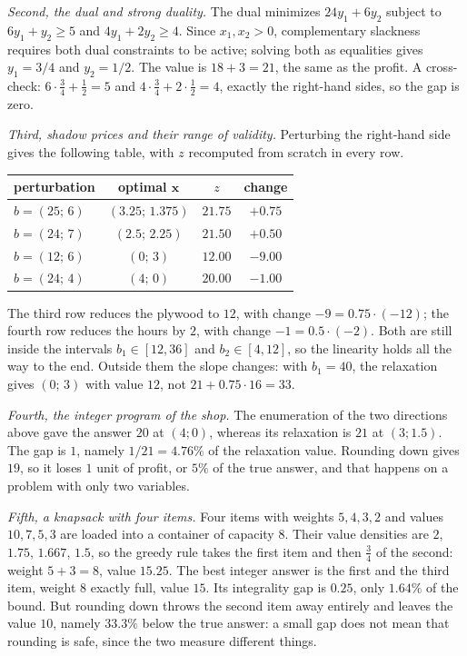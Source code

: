 \emph{Second, the dual and strong duality.} The dual minimizes $24y_{1}+6y_{2}$ subject to
$6y_{1}+y_{2}\ge5$ and $4y_{1}+2y_{2}\ge4$. Since $x_{1},x_{2}>0$, complementary slackness
requires both dual constraints to be active; solving both as equalities gives $y_{1}=3/4$ and
$y_{2}=1/2$. The value is $18+3=21$, the same as the profit. A cross-check:
$6\cdot\tfrac34+\tfrac12=5$ and $4\cdot\tfrac34+2\cdot\tfrac12=4$, exactly the right-hand
sides, so the gap is zero.

\emph{Third, shadow prices and their range of validity.} Perturbing the right-hand side gives
the following table, with $z$ recomputed from scratch in every row.
\begin{center}
\begin{tabular}{lccc}
\hline
perturbation & optimal $\mathbf{x}$ & $z$ & change \\
\hline
$b=(25;\,6)$ & $(3.25;\,1.375)$ & $21.75$ & $+0.75$ \\
$b=(24;\,7)$ & $(2.5;\,2.25)$ & $21.50$ & $+0.50$ \\
$b=(12;\,6)$ & $(0;\,3)$ & $12.00$ & $-9.00$ \\
$b=(24;\,4)$ & $(4;\,0)$ & $20.00$ & $-1.00$ \\
\hline
\end{tabular}
\end{center}
The third row reduces the plywood to $12$, with change
$-9=0.75\cdot(-12)$; the fourth row reduces the hours by $2$, with change
$-1=0.5\cdot(-2)$. Both are still inside the intervals $b_{1}\in[12,36]$ and
$b_{2}\in[4,12]$, so the linearity holds all the way to the end. Outside them the slope changes:
with $b_{1}=40$, the relaxation gives $(0;\,3)$ with value $12$, not
$21+0.75\cdot16=33$.

\emph{Fourth, the integer program of the shop.} The enumeration of the two directions above gave
the answer $20$ at $(4;0)$, whereas its relaxation is $21$ at $(3;1.5)$. The gap is $1$, namely
$1/21=4.76\%$ of the relaxation value. Rounding down gives $19$, so it loses
$1$ unit of profit, or $5\%$ of the true answer, and that happens on a problem with only two
variables.

\emph{Fifth, a knapsack with four items.} Four items with weights $5,4,3,2$ and
values $10,7,5,3$ are loaded into a container of capacity $8$. Their value densities are $2$,
$1.75$, $1.667$, $1.5$, so the greedy rule takes the first item and then $\tfrac34$ of the second:
weight $5+3=8$, value $15.25$. The best integer answer is the first and the third item, weight
$8$ exactly full, value $15$. Its integrality gap is $0.25$, only $1.64\%$ of the bound. But
rounding down throws the second item away entirely and leaves the value $10$, namely
$33.3\%$ below the true answer: a small gap does not mean that rounding is safe, since the two
measure different things.

